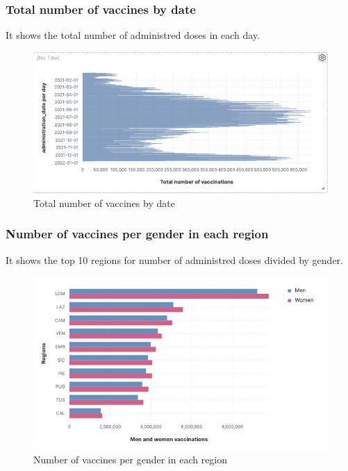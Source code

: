 \documentclass[12pt, a4paper]{article}
\begin{document}
\subsubsection{Total number of vaccines by date}
It shows the total number of administred doses in each day.
\begin{figure}[H]
  \centering
  \includegraphics[width=1\linewidth]{img (12).png}
  \caption*{Total number of vaccines by date}
\end{figure}

\subsubsection{Number of vaccines per gender in each region}
It shows the top 10 regions for number of administred doses divided by gender.
\begin{figure}[H]
  \centering
  \includegraphics[width=.9\linewidth]{img (14).png}
  \caption*{Number of vaccines per gender in each region}
\end{figure}
\end{document}
